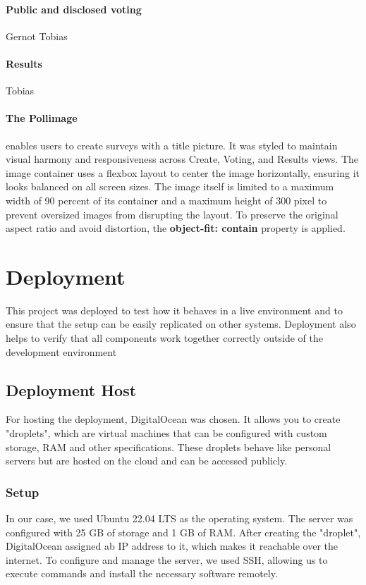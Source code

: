 \documentclass[a4paper,12pt]{report}
\begin{document}
\paragraph{Public and disclosed voting} Gernot Tobias
\paragraph{Results} Tobias
\paragraph{The Pollimage} enables users to create surveys with a title picture. It was styled to maintain visual harmony and responsiveness across Create, Voting, and Results views. The image container uses a flexbox layout to center the image horizontally, ensuring it looks balanced on all screen sizes. The image itself is limited to a maximum width of 90 percent of its container and a maximum height of 300 pixel to prevent oversized images from disrupting the layout. To preserve the original aspect ratio and avoid distortion, the \textbf{object-fit: contain} property is applied.\parencite{cssobjectfit}

\section{Deployment}
This project was deployed to test how it behaves in a live environment and to ensure that the setup can be easily replicated on other systems. Deployment also helps to verify that all components work together correctly outside of the development environment 
\subsection{Deployment Host}
For hosting the deployment, DigitalOcean was chosen. It allows you to create "droplets", which are virtual machines that can be configured with custom storage, RAM and other specifications. These droplets behave like personal servers but are hosted on the cloud and can be accessed publicly.
\subsubsection{Setup}
In our case, we used Ubuntu 22.04 LTS as the operating system. The server was configured with 25 GB of storage and 1 GB of RAM. After creating the "droplet", DigitalOcean assigned ab IP address to it, which makes it reachable over the internet. To configure and manage the server, we used SSH, allowing us to execute commands and install the necessary software remotely.
\end{document}
